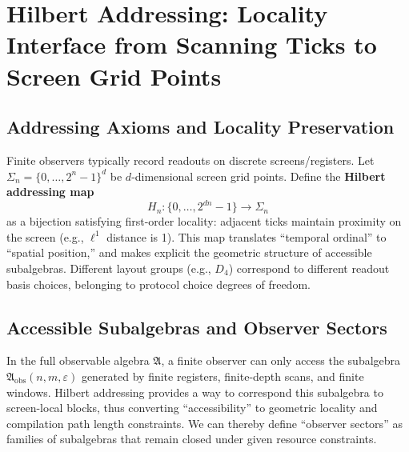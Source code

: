 \section{Hilbert Addressing: Locality Interface from Scanning Ticks to Screen Grid Points}

\subsection{Addressing Axioms and Locality Preservation}

Finite observers typically record readouts on discrete screens/registers. Let $\Sigma_n=\{0,\dots,2^n-1\}^d$ be $d$-dimensional screen grid points. Define the \textbf{Hilbert addressing map}
\[
H_n:\{0,\dots,2^{dn}-1\}\to\Sigma_n
\]
as a bijection satisfying first-order locality: adjacent ticks maintain proximity on the screen (e.g., $\ell^1$ distance is 1). This map translates ``temporal ordinal'' to ``spatial position,'' and makes explicit the geometric structure of accessible subalgebras. Different layout groups (e.g., $D_4$) correspond to different readout basis choices, belonging to protocol choice degrees of freedom.

\subsection{Accessible Subalgebras and Observer Sectors}

In the full observable algebra $\mathfrak{A}$, a finite observer can only access the subalgebra $\mathfrak{A}_{\mathrm{obs}}(n,m,\varepsilon)$ generated by finite registers, finite-depth scans, and finite windows. Hilbert addressing provides a way to correspond this subalgebra to screen-local blocks, thus converting ``accessibility'' to geometric locality and compilation path length constraints. We can thereby define ``observer sectors'' as families of subalgebras that remain closed under given resource constraints.
